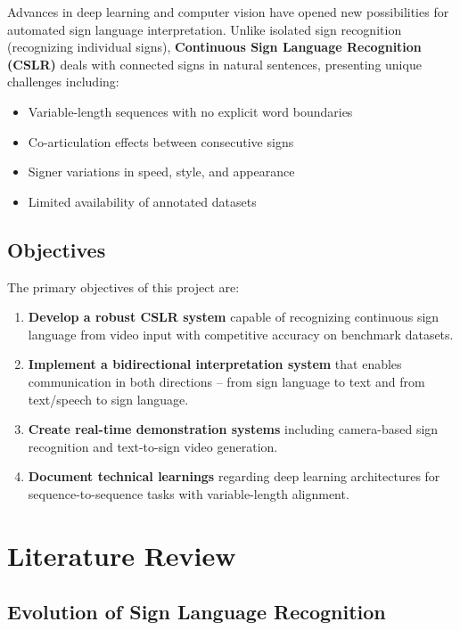 \documentclass[12pt,a4paper]{article}
\begin{document}
Advances in deep learning and computer vision have opened new possibilities for automated sign language interpretation. Unlike isolated sign recognition (recognizing individual signs), \textbf{Continuous Sign Language Recognition (CSLR)} deals with connected signs in natural sentences, presenting unique challenges including:

\begin{itemize}[noitemsep]
    \item Variable-length sequences with no explicit word boundaries
    \item Co-articulation effects between consecutive signs
    \item Signer variations in speed, style, and appearance
    \item Limited availability of annotated datasets
\end{itemize}

\subsection{Objectives}

The primary objectives of this project are:

\begin{enumerate}[noitemsep]
    \item \textbf{Develop a robust CSLR system} capable of recognizing continuous sign language from video input with competitive accuracy on benchmark datasets.
    
    \item \textbf{Implement a bidirectional interpretation system} that enables communication in both directions -- from sign language to text and from text/speech to sign language.
    
    \item \textbf{Create real-time demonstration systems} including camera-based sign recognition and text-to-sign video generation.
    
    \item \textbf{Document technical learnings} regarding deep learning architectures for sequence-to-sequence tasks with variable-length alignment.
\end{enumerate}

\section{Literature Review}

\subsection{Evolution of Sign Language Recognition}
\end{document}
